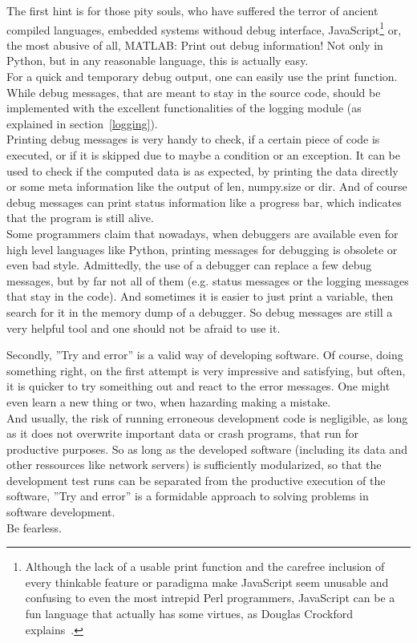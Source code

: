 		The first hint is for those pity souls, who have suffered the terror of ancient compiled languages, embedded systems withoud debug interface, JavaScript\footnote{Although the lack of a usable print function and the carefree inclusion of every thinkable feature or paradigma make JavaScript seem unusable and confusing to even the most intrepid Perl programmers, JavaScript can be a fun language that actually has some virtues, as Douglas Crockford explains~\cite{Crockford}.} or, the most abusive of all, MATLAB:
		Print out debug information! Not only in Python, but in any reasonable language, this is actually easy.\\
		For a quick and temporary debug output, one can easily use the {\normalfont \ttfamily print} function.
		While debug messages, that are meant to stay in the source code, should be implemented with the excellent functionalities of the {\normalfont \ttfamily logging} module (as explained in section~\ref{logging}).\\
		Printing debug messages is very handy to check, if a certain piece of code is executed, or if it is skipped due to maybe a condition or an exception.
		It can be used to check if the computed data is as expected, by printing the data directly or some meta information like the output of {\normalfont \ttfamily len}, {\normalfont \ttfamily numpy.size} or {\normalfont \ttfamily dir}.
		And of course debug messages can print status information like a progress bar, which indicates that the program is still alive.\\
		Some programmers claim that nowadays, when debuggers are available even for high level languages like Python, printing messages for debugging is obsolete or even bad style.
		Admittedly, the use of a debugger can replace a few debug messages, but by far not all of them (e.g. status messages or the logging messages that stay in the code).
		And sometimes it is easier to just print a variable, then search for it in the memory dump of a debugger.
		So debug messages are still a very helpful tool and one should not be afraid to use it.

		Secondly, ''Try and error'' is a valid way of developing software.
		Of course, doing something right, on the first attempt is very impressive and satisfying, but often, it is quicker to try someithing out and react to the error messages.
		One might even learn a new thing or two, when hazarding making a mistake.\\
		And usually, the risk of running erroneous development code is negligible, as long as it does not overwrite important data or crash programs, that run for productive purposes.
		So as long as the developed software (including its data and other ressources like network servers) is sufficiently modularized, so that the development test runs can be separated from the productive execution of the software, ''Try and error'' is a formidable approach to solving problems in software development.\\
		Be fearless.

